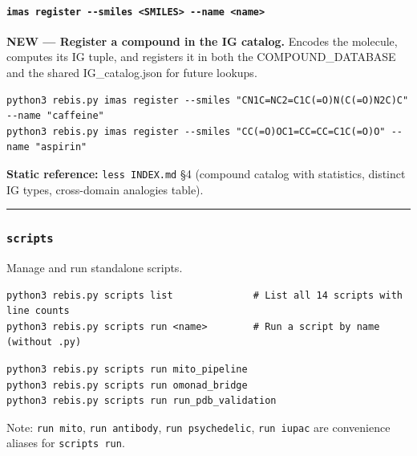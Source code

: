 \documentclass[12pt,a4paper]{article}
\begin{document}
\hypertarget{imas-register---smiles-smiles---name-name}{%
\paragraph{\texorpdfstring{\texttt{imas\ register\ -\/-smiles\ \textless{}SMILES\textgreater{}\ -\/-name\ \textless{}name\textgreater{}}}{imas register -\/-smiles \textless SMILES\textgreater{} -\/-name \textless name\textgreater{}}}\label{imas-register---smiles-smiles---name-name}}

\textbf{NEW --- Register a compound in the IG catalog.} Encodes the
molecule, computes its IG tuple, and registers it in both the
COMPOUND\_DATABASE and the shared IG\_catalog.json for future lookups.

\begin{verbatim}
python3 rebis.py imas register --smiles "CN1C=NC2=C1C(=O)N(C(=O)N2C)C" --name "caffeine"
python3 rebis.py imas register --smiles "CC(=O)OC1=CC=CC=C1C(=O)O" --name "aspirin"
\end{verbatim}

\textbf{Static reference:} \texttt{less\ INDEX.md} §4 (compound catalog
with statistics, distinct IG types, cross-domain analogies table).

\begin{center}\rule{0.5\linewidth}{0.5pt}\end{center}

\hypertarget{scripts}{%
\subsubsection{\texorpdfstring{\texttt{scripts}}{scripts}}\label{scripts}}

Manage and run standalone scripts.

\begin{verbatim}
python3 rebis.py scripts list              # List all 14 scripts with line counts
python3 rebis.py scripts run <name>        # Run a script by name (without .py)
\end{verbatim}

\begin{verbatim}
python3 rebis.py scripts run mito_pipeline
python3 rebis.py scripts run omonad_bridge
python3 rebis.py scripts run run_pdb_validation
\end{verbatim}

Note: \texttt{run\ mito}, \texttt{run\ antibody},
\texttt{run\ psychedelic}, \texttt{run\ iupac} are convenience aliases
for \texttt{scripts\ run}.
\end{document}
